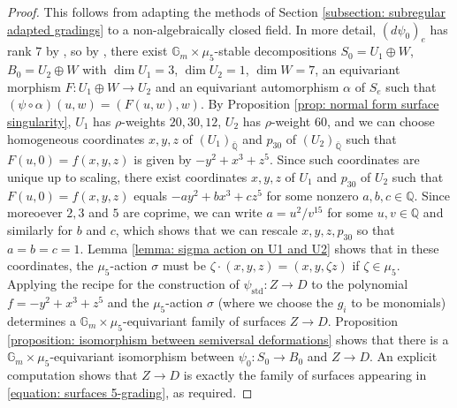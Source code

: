\documentclass{article} %
\numberwithin{equation}{section}
\theoremstyle{definition}
\newcommand{\G}{\mathbb{G}}
\newcommand{\Q}{\mathbb{Q}}
\begin{document}
\begin{proof}
    This follows from adapting the methods of Section \ref{subsection: subregular adapted gradings} to a non-algebraically closed field.
    In more detail, $(d\psi_0)_e$ has rank $7$ by \cite[Section 8.3, Proposition 1]{Slodowy-simplesingularitiesalggroups}, so by \cite[Section 8.1, Lemma 2]{Slodowy-simplesingularitiesalggroups}, there exist $\G_m \times \mu_5$-stable decompositions $S_0 = U_1 \oplus W$, $B_0 = U_2 \oplus W$ with $\dim U_1 = 3$, $\dim U_2 = 1$, $\dim W = 7$, an equivariant morphism $F\colon  U_1 \oplus W \rightarrow U_2$ and an equivariant automorphism $\alpha$ of $S_e$ such that $(\psi\circ \alpha)(u,w)=(F(u,w),w)$.
    By Proposition \ref{prop: normal form surface singularity}, $U_1$ has $\rho$-weights $20,30,12$, $U_2$ has $\rho$-weight $60$, and we can choose homogeneous coordinates $x,y,z$ of $(U_1)_{\bar{\Q}}$ and $p_{30}$ of $(U_2)_{\bar{\Q}}$ such that $F(u,0) = f(x,y,z)$ is given by $-y^2 + x^3+ z^5$.
    Since such coordinates are unique up to scaling, there exist coordinates $x,y,z$ of $U_1$ and $p_{30}$ of $U_2$ such that $F(u,0) = f(x,y,z)$ equals $-ay^2 + bx^3+ cz^5$ for some nonzero $a,b,c\in\Q$.
    Since moreoever $2,3$ and $5$ are coprime, we can write $a = u^2/v^{15}$ for some $u,v \in \Q$ and similarly for $b$ and $c$, which shows that we can rescale $x,y,z,p_{30}$ so that $a=b=c=1$.
    Lemma \ref{lemma: sigma action on U1 and U2} shows that in these coordinates, the $\mu_5$-action $\sigma$ must be $\zeta\cdot (x,y,z) = (x,y,\zeta z)$ if $\zeta\in \mu_5$.
    Applying the recipe for the construction of $\psi_{\mathrm{std}}\colon Z\rightarrow D$ to the polynomial $f = -y^2 + x^3 + z^5$ and the $\mu_5$-action $\sigma$ (where we choose the $g_i$ to be monomials) determines a $\G_m\times \mu_5$-equivariant family of surfaces $Z\rightarrow D$. 
    Proposition \ref{proposition: isomorphism between semiversal deformations} shows that there is a $\G_m\times \mu_5$-equivariant isomorphism between $\psi_0\colon S_0\rightarrow B_0$ and $Z\rightarrow D$.
    An explicit computation shows that $Z\rightarrow D$ is exactly the family of surfaces appearing in \eqref{equation: surfaces 5-grading}, as required.
\end{proof}
\end{document}
